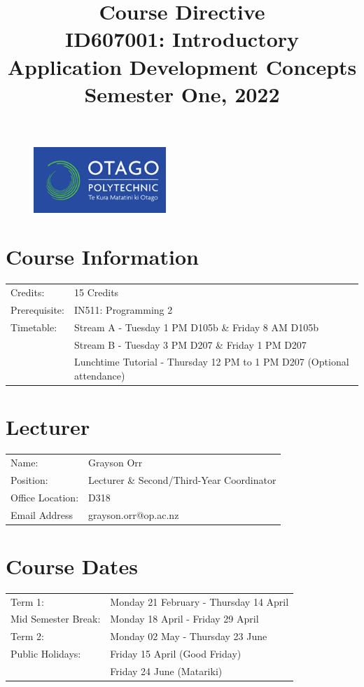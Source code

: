 \documentclass{article}
\author{}
\begin{document}
 

\begin{figure}
	\includegraphics[width=50mm]{../img/logo.png} 
\end{figure}

\title{Course Directive\\ID607001: Introductory Application Development Concepts\\Semester One, 2022}
\date{}
\maketitle

\section*{Course Information}
\begin{tabular}{ll}
	Credits:            & 15 Credits                             \\
	Prerequisite:       & IN511: Programming 2                   \\
	Timetable:  & Stream A - Tuesday 1 PM D105b \& Friday 8 AM D105b  \\    
	  			& Stream B - Tuesday 3 PM D207 \& Friday 1 PM D207  \\ 
				& Lunchtime Tutorial - Thursday 12 PM to 1 PM D207 (Optional attendance)
\end{tabular} 

\section*{Lecturer}
\begin{tabular}{ll}
	Name:            & Grayson Orr                            \\
	Position:       & Lecturer \& Second/Third-Year Coordinator                   \\
	Office Location:  & D318  \\    
	Email Address  & grayson.orr@op.ac.nz  \\   
\end{tabular}

\section*{Course Dates}
\begin{tabular}{ll} 
	Term 1:             & Monday 21 February - Thursday 14 April  \\
	Mid Semester Break: & Monday 18 April - Friday 29 April    \\
	Term 2:             & Monday 02 May - Thursday 23 June    \\
	Public Holidays:   & Friday 15 April (Good Friday) \\
	& Friday 24 June (Matariki)
\end{tabular}
\end{document}
